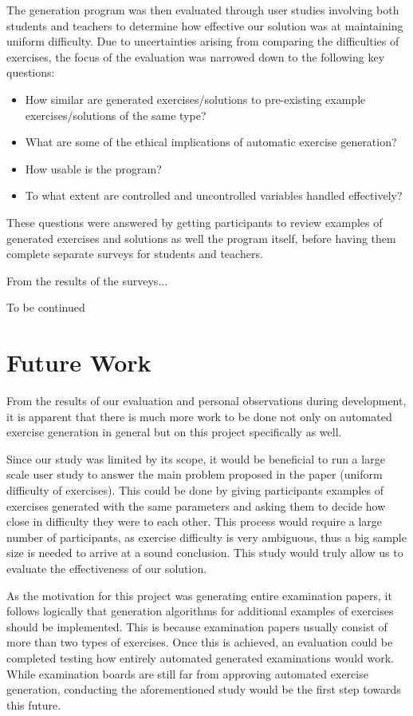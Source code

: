 \documentclass{l4proj}
\begin{document}
The generation program was then evaluated through user studies involving both students and teachers to determine how effective our solution was at maintaining uniform difficulty. Due to uncertainties arising from comparing the difficulties of exercises, the focus of the evaluation was narrowed down to the following key questions:

\begin{itemize}
	\item
	How similar are generated exercises/solutions to pre-existing example exercises/solutions of the same type?
	\item
	What are some of the ethical implications of automatic exercise generation?
	\item
	How usable is the program?
	\item
	To what extent are controlled and uncontrolled variables handled effectively?
\end{itemize}

These questions were answered by getting participants to review examples of generated exercises and solutions as well the program itself, before having them complete separate surveys for students and teachers. 

From the results of the surveys...

To be continued

\section{Future Work}
\label{sec:future_work}

From the results of our evaluation and personal observations during development, it is apparent that there is much more work to be done not only on automated exercise generation in general but on this project specifically as well.

Since our study was limited by its scope, it would be beneficial to run a large scale user study to answer the main problem proposed in the paper (uniform difficulty of exercises). This could be done by giving participants examples of exercises generated with the same parameters and asking them to decide how close in difficulty they were to each other. This process would require a large number of participants, as exercise difficulty is very ambiguous, thus a big sample size is needed to arrive at a sound conclusion. This study would truly allow us to evaluate the effectiveness of our solution.

As the motivation for this project was generating entire examination papers, it follows logically that generation algorithms for additional examples of exercises should be implemented. This is because examination papers usually consist of more than two types of exercises. Once this is achieved, an evaluation could be completed testing how entirely automated generated examinations would work. While examination boards are still far from approving automated exercise generation, conducting the aforementioned study would be the first step towards this future.
\end{document}
